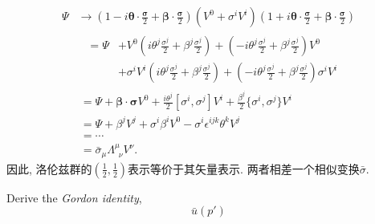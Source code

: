 \begin{equation}
  \begin{aligned}
    \Psi & \rightarrow (1 - i\bm{\theta}\cdot\tfrac{\bm{\sigma}}{2} + \bm{\beta}\cdot\tfrac{\bm{\sigma}}{2}) (V^0 + \sigma^i V^i) (1 + i\bm{\theta}\cdot\tfrac{\bm{\sigma}}{2} + \bm{\beta}\cdot\tfrac{\bm{\sigma}}{2}) \\
         & \begin{aligned}
             \ \ =\Psi & + V^0 (i\theta^j\tfrac{\sigma^j}{2} + \beta^j\tfrac{\sigma^j}{2}) + (-i\theta^j\tfrac{\sigma^j}{2} + \beta^j\tfrac{\sigma^j}{2}) V^0                   \\
                       & + \sigma^i V^i (i\theta^j\tfrac{\sigma^j}{2} + \beta^j\tfrac{\sigma^j}{2}) + (-i\theta^j\tfrac{\sigma^j}{2} + \beta^j\tfrac{\sigma^j}{2}) \sigma^i V^i
           \end{aligned}                                           \\
         & \ = \Psi + \bm{\beta}\cdot\bm{\sigma}V^0 + \tfrac{i\theta^j}{2}[\sigma^i, \sigma^j]V^i +  \tfrac{\beta^j}{2}\{\sigma^i, \sigma^j\}V^i                                                                        \\
         & \ = \Psi + \beta^j V^j + \sigma^i \beta^i V^0 - \sigma^i \epsilon^{ijk} \theta^k V^j                                                                                                                         \\
         & \ = \cdots                                                                                                                                                                                                   \\
         & \ = \bar{\sigma}_{\mu} \Lambda^{\mu}_{\phantom{0}\nu} V^{\nu}.
  \end{aligned}
\end{equation}
因此, 洛伦兹群的$(\frac{1}{2}, \frac{1}{2})$表示等价于其矢量表示.
两者相差一个相似变换$\bar{\sigma}$.

Derive the \textit{Gordon identity},
\begin{equation}
  \bar{u}(p')
\end{equation}